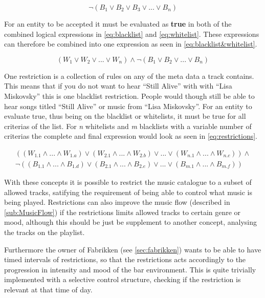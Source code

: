 \begin{equation}
\label{eq:blacklist}
	\neg(B_1 \vee B_2 \vee B_3 \vee ... \vee B_n)
\end{equation}

For an entity to be accepted it must be evaluated as \textbf{true} in both of the combined logical expressions in \cref{eq:blacklist} and \cref{eq:whitelist}. These expressions can therefore be combined into one expression as seen in \cref{eq:blacklist&whitelist}.

\begin{equation}
\label{eq:blacklist&whitelist}
		(W_1 \vee W_2 \vee ... \vee W_n) \wedge \neg(B_1 \vee B_2 \vee ... \vee B_n)
\end{equation}

One restriction is a collection of rules on any of the meta data a track contains. This means that if you do not want to hear \enquote{Still Alive} with with \enquote{Lisa Miskovsky} this is one blacklist restriction. People would though still be able to hear songs titled \enquote{Still Alive} or music from \enquote{Lisa Miskovsky}. For an entity to evaluate true, thus being on the blacklist or whitelists, it must be true for all criterias of the list. For \emph{n} whitelists and \emph{m} blacklists with a variable number of criterias the complete and final expression would look as seen in \cref{eq:restrictions}.

\begin{eqnarray}
	\label{eq:restrictions}
	((W_{1.1} \wedge ... \wedge W_{1.a}) \vee (W_{2.1} \wedge ... \wedge W_{2.b}) \vee ... \vee (W_{n.1} \wedge ... \wedge W_{n.c})) \wedge \nonumber \\ \neg((B_{1.1} \wedge ... \wedge B_{1.d}) \vee (B_{2.1} \wedge ... \wedge B_{2.e}) \vee ... \vee (B_{m.1} \wedge ... \wedge B_{m.f}))
\end{eqnarray}

With these concepts it is possible to restrict the music catalogue to a subset of allowed tracks, satifying the requirement of being able to control what music is being played. Restrictions can also improve the music flow (described in \cref{sub:MusicFlow}) if the restrictions limits allowed tracks to certain genre or mood, although this should be just be supplement to another concept, analysing the tracks on the playlist.

Furthermore the owner of Fabrikken (see \cref{sec:fabrikken}) wants to be able to have timed intervals of restrictions, so that the restrictions acts accordingly to the progression in intensity and mood of the bar environment. This is quite trivially implemented with a selective control structure, checking if the restriction is relevant at that time of day.